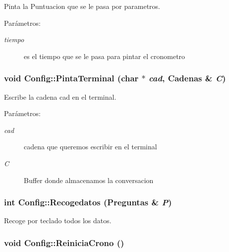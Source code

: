 Pinta la Puntuacion que se le pasa por parametros. 

\begin{Desc}
\item[Parámetros:]
\begin{description}
\item[{\em tiempo}]es el tiempo que se le pasa para pintar el cronometro \end{description}
\end{Desc}
\hypertarget{class_config_fc16e01f77244e2ea4786c814cb4fa99}{
\subsubsection[{PintaTerminal}]{\setlength{\rightskip}{0pt plus 5cm}void Config::PintaTerminal (char $\ast$ {\em cad}, \/  {\bf Cadenas} \& {\em C})}}
\label{class_config_fc16e01f77244e2ea4786c814cb4fa99}


Escribe la cadena cad en el terminal. 

\begin{Desc}
\item[Parámetros:]
\begin{description}
\item[{\em cad}]cadena que queremos escribir en el terminal \item[{\em C}]Buffer donde almacenamos la conversacion \end{description}
\end{Desc}
\hypertarget{class_config_6098dc6aed67f0e0df613d56cceeddc7}{
\subsubsection[{Recogedatos}]{\setlength{\rightskip}{0pt plus 5cm}int Config::Recogedatos ({\bf Preguntas} \& {\em P})}}
\label{class_config_6098dc6aed67f0e0df613d56cceeddc7}


Recoge por teclado todos los datos. 

\hypertarget{class_config_5502bfd9175981e9a5c8543e618a2ace}{
\subsubsection[{ReiniciaCrono}]{\setlength{\rightskip}{0pt plus 5cm}void Config::ReiniciaCrono ()}}
\label{class_config_5502bfd9175981e9a5c8543e618a2ace}


